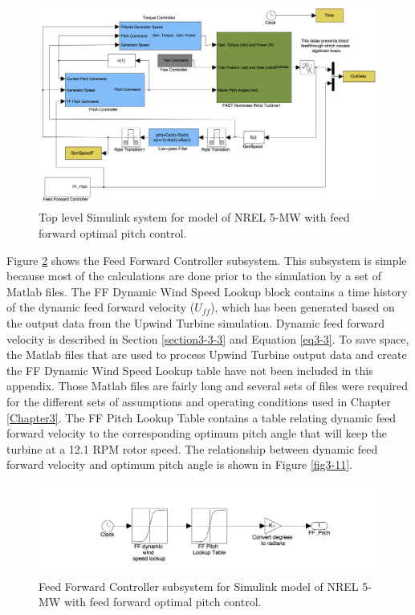  
 
\begin{figure}[ht]
	\centering
		\includegraphics[width=\linewidth]{Figures/AppendixBFigures/FF_Pitch1.png}
	\caption{Top level Simulink system for model of NREL 5-MW with feed forward optimal pitch control.}
	\label{figB-7}
\end{figure}

Figure \ref{figB-8} shows the Feed Forward Controller subsystem. This subsystem is simple because most of the calculations are done prior to the simulation by a set of Matlab files. The FF Dynamic Wind Speed Lookup block contains a time history of the dynamic feed forward velocity ($U_{ff}$), which has been generated based on the output data from the Upwind Turbine simulation. Dynamic feed forward velocity is described in Section \ref{section3-3-3} and Equation \ref{eq3-3}. To save space, the Matlab files that are used to process Upwind Turbine output data and create the FF Dynamic Wind Speed Lookup table have not been included in this appendix. Those Matlab files are fairly long and several sets of files were required for the different sets of assumptions and operating conditions used in Chapter \ref{Chapter3}. The FF Pitch Lookup Table contains a table relating dynamic feed forward velocity to the corresponding optimum pitch angle that will keep the turbine at a 12.1 RPM rotor speed. The relationship between dynamic feed forward velocity and optimum pitch angle is shown in Figure \ref{fig3-11}.

\begin{figure}[ht]
	\centering
		\includegraphics[width=\linewidth]{Figures/AppendixBFigures/FF_Pitch2.png}
	\caption{Feed Forward Controller subsystem for Simulink model of NREL 5-MW with feed forward optimal pitch control.}
	\label{figB-8}
\end{figure}


